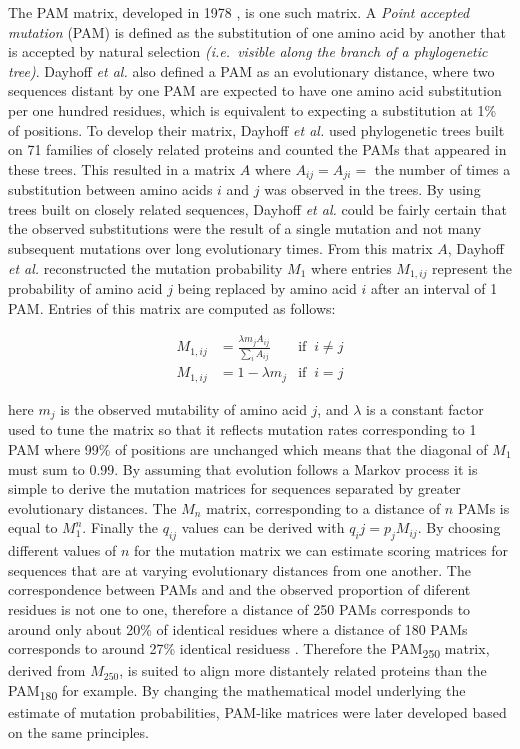 \documentclass[
  11pt,
  twoside,
  BCOR=10mm,
  listof=totoc]{scrbook}
\begin{document}
The PAM matrix, developed in 1978 \autocite{dayhoffModelEvolutionaryChange1978}, is one such matrix. A \emph{Point accepted mutation} (PAM) is defined as the substitution of one amino acid by another that is accepted by natural selection \emph{(i.e.~visible along the branch of a phylogenetic tree)}. Dayhoff \emph{et al.} also defined a PAM as an evolutionary distance, where two sequences distant by one PAM are expected to have one amino acid substitution per one hundred residues, which is equivalent to expecting a substitution at 1\% of positions. To develop their matrix, Dayhoff \emph{et al.} used phylogenetic trees built on 71 families of closely related proteins and counted the PAMs that appeared in these trees. This resulted in a matrix \(A\) where \(A_{ij}=A_{ji}=\) the number of times a substitution between amino acids \(i\) and \(j\) was observed in the trees. By using trees built on closely related sequences, Dayhoff \emph{et al.} could be fairly certain that the observed substitutions were the result of a single mutation and not many subsequent mutations over long evolutionary times. From this matrix \(A\), Dayhoff \emph{et al.} reconstructed the mutation probability \(M_1\) where entries \(M_{1,ij}\) represent the probability of amino acid \(j\) being replaced by amino acid \(i\) after an interval of 1 PAM. Entries of this matrix are computed as follows:

\begin{align}
M_{1,ij}&=\frac{\lambda m_j A_{ij}}{\sum_i A_{ij}}\;\; & \text{if}\;\;i\neq j\\
M_{1,ij}&=1-\lambda m_j & \text{if}\;\; i = j 
\end{align}

here \(m_j\) is the observed mutability of amino acid \(j\), and \(\lambda\) is a constant factor used to tune the matrix so that it reflects mutation rates corresponding to 1 PAM where 99\% of positions are unchanged which means that the diagonal of \(M_1\) must sum to 0.99. By assuming that evolution follows a Markov process it is simple to derive the mutation matrices for sequences separated by greater evolutionary distances. The \(M_n\) matrix, corresponding to a distance of \(n\) PAMs is equal to \(M_1^n\). Finally the \(q_{ij}\) values can be derived with \(q_ij=p_jM_{ij}\). By choosing different values of \(n\) for the mutation matrix we can estimate scoring matrices for sequences that are at varying evolutionary distances from one another. The correspondence between PAMs and and the observed proportion of diferent residues is not one to one, therefore a distance of 250 PAMs corresponds to around only about 20\% of identical residues where a distance of 180 PAMs corresponds to around 27\% identical residuess \autocite{altschulSubstitutionMatrices2013,dayhoffModelEvolutionaryChange1978}. Therefore the PAM\textsubscript{250} matrix, derived from \(M_{250}\), is suited to align more distantely related proteins than the PAM\textsubscript{180} for example. By changing the mathematical model underlying the estimate of mutation probabilities, PAM-like matrices \autocite{mullerModelingAminoAcid2000} were later developed based on the same principles.
\end{document}
